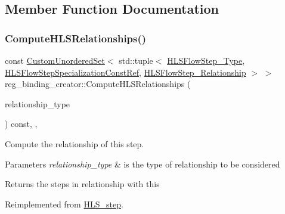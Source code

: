 \subsection{Member Function Documentation}
\mbox{\label{classreg__binding__creator_a507cb435a1f0b4ccde1242aa6b930ea6}} 
\subsubsection{\texorpdfstring{Compute\+H\+L\+S\+Relationships()}{ComputeHLSRelationships()}}
{\footnotesize\ttfamily const \hyperlink{classCustomUnorderedSet}{Custom\+Unordered\+Set}$<$ std\+::tuple$<$ \hyperlink{hls__step_8hpp_ada16bc22905016180e26fc7e39537f8d}{H\+L\+S\+Flow\+Step\+\_\+\+Type}, \hyperlink{hls__step_8hpp_a5fdd2edf290c196531d21d68e13f0e74}{H\+L\+S\+Flow\+Step\+Specialization\+Const\+Ref}, \hyperlink{hls__step_8hpp_a3ad360b9b11e6bf0683d5562a0ceb169}{H\+L\+S\+Flow\+Step\+\_\+\+Relationship} $>$ $>$ reg\+\_\+binding\+\_\+creator\+::\+Compute\+H\+L\+S\+Relationships (\begin{DoxyParamCaption}\item[{const \hyperlink{classDesignFlowStep_a723a3baf19ff2ceb77bc13e099d0b1b7}{Design\+Flow\+Step\+::\+Relationship\+Type}}]{relationship\+\_\+type }\end{DoxyParamCaption}) const\hspace{0.3cm}{\ttfamily [override]}, {\ttfamily [protected]}, {\ttfamily [virtual]}}



Compute the relationship of this step. 


\begin{DoxyParams}{Parameters}
{\em relationship\+\_\+type} & is the type of relationship to be considered \\
\hline
\end{DoxyParams}
\begin{DoxyReturn}{Returns}
the steps in relationship with this 
\end{DoxyReturn}


Reimplemented from \hyperlink{classHLS__step_aed0ce8cca9a1ef18e705fc1032ad4de5}{H\+L\+S\+\_\+step}.



